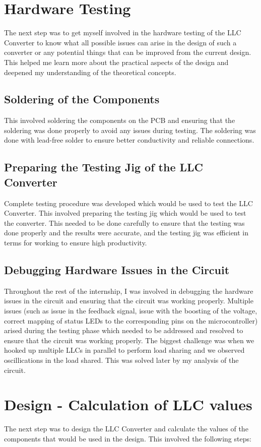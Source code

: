 \section{Hardware Testing}
The next step was to get myself involved in the hardware testing of the LLC Converter to know what
all possible issues can arise in the design of such a converter or any potential things that can be
improved from the current design.\\
This helped me learn more about the practical aspects of the design and deepened my understanding of the theoretical concepts.

\subsection{Soldering of the Components}
This involved soldering the components on the PCB and ensuring that the soldering was done properly to avoid any issues during testing.
The soldering was done with lead-free solder to ensure better conductivity and reliable connections.
\subsection{Preparing the Testing Jig of the LLC Converter}
Complete testing procedure was developed which would be used to test the LLC Converter. This involved preparing the testing jig which would be used to test the converter.
This needed to be done carefully to ensure that the testing was done properly and the results were accurate, and the testing jig was efficient in terms for working to ensure high productivity.

\subsection{Debugging Hardware Issues in the Circuit}
Throughout the rest of the internship, I was involved in debugging the hardware issues in the circuit and ensuring that the circuit was working properly.
Multiple issues (such as issue in the feedback signal, issue with the boosting of the voltage, correct mapping of status LEDs to the corresponding pins on the microcontroller) arised during the testing phase which needed to be addressed and resolved to ensure that the circuit was working properly.
The biggest challenge was when we hooked up multiple LLCs in parallel to perform load sharing and we observed oscillications in the load shared. This was solved later by my analysis of the circuit.

\section{Design - Calculation of LLC values}
The next step was to design the LLC Converter and calculate the values of the components that would be used in the design. This involved the following steps:

